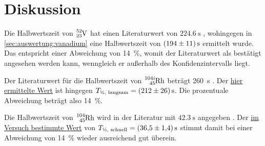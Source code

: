 \section{Diskussion} \label{sec:diskussion}

Die Halbwertszeit von
$\ce{^{52}_{23}V}$
hat einen Literaturwert von
$\SI{224.6}{\second}$ \cite{hwz_vanadium},
wohingegen in \autoref{sec:auswertung:vanadium}
eine Halbwertszeit von $\SI{194 \pm 11}{\second}$ ermittelt wurde.
Das entspricht einer Abweichung von \SI{14}{\percent},
womit der Literaturwert als bestätigt angesehen werden kann,
wenngleich er außerhalb des Konfidenzintervalls liegt.

Der Literaturwert für die Halbwertszeit von $\ce{^{104i}_{45}Rh}$
beträgt \SI{260}{\second} \cite{hwz_rhodium_langsam}.
Der \hyperref[sec:auswertung:rhodium:langsam]{hier ermittelte Wert}
ist hingegen $T_\text{½, langsam} = \SI{212 \pm 26}{\second}$.
Die prozentuale Abweichung beträgt also \SI{14}{\percent}.

Die Halbwertszeit von $\ce{^{104}_{45}Rh}$
wird in der Literatur mit
$\SI{42.3}{\second}$ angegeben \cite{hwz_rhodium_schnell}.
Der \hyperref[sec:auswertung:rhodium:schnell]{im Versuch bestimmte Wert} von
$T_\text{½, schnell} = \SI{36.5 \pm 1.4}{\second}$
stimmt damit bei einer Abweichung von \SI{14}{\percent} wieder ausreichend gut überein.

%
%
%

